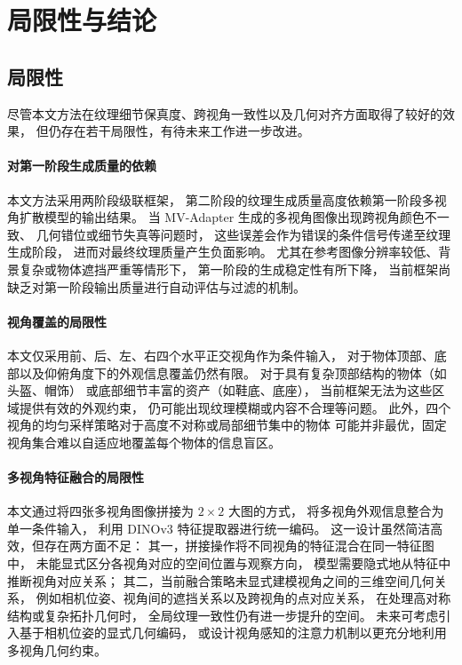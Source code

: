 \cleardoublepage

\section{局限性与结论}

\subsection{局限性}

尽管本文方法在纹理细节保真度、跨视角一致性以及几何对齐方面取得了较好的效果，
但仍存在若干局限性，有待未来工作进一步改进。

\paragraph{对第一阶段生成质量的依赖}

本文方法采用两阶段级联框架，
第二阶段的纹理生成质量高度依赖第一阶段多视角扩散模型的输出结果。
当 MV-Adapter 生成的多视角图像出现跨视角颜色不一致、
几何错位或细节失真等问题时，
这些误差会作为错误的条件信号传递至纹理生成阶段，
进而对最终纹理质量产生负面影响。
尤其在参考图像分辨率较低、背景复杂或物体遮挡严重等情形下，
第一阶段的生成稳定性有所下降，
当前框架尚缺乏对第一阶段输出质量进行自动评估与过滤的机制。

\paragraph{视角覆盖的局限性}

本文仅采用前、后、左、右四个水平正交视角作为条件输入，
对于物体顶部、底部以及仰俯角度下的外观信息覆盖仍然有限。
对于具有复杂顶部结构的物体（如头盔、帽饰）
或底部细节丰富的资产（如鞋底、底座），
当前框架无法为这些区域提供有效的外观约束，
仍可能出现纹理模糊或内容不合理等问题。
此外，四个视角的均匀采样策略对于高度不对称或局部细节集中的物体
可能并非最优，固定视角集合难以自适应地覆盖每个物体的信息盲区。

\paragraph{多视角特征融合的局限性}

本文通过将四张多视角图像拼接为 $2\times2$ 大图的方式，
将多视角外观信息整合为单一条件输入，
利用 DINOv3 特征提取器进行统一编码。
这一设计虽然简洁高效，但存在两方面不足：
其一，拼接操作将不同视角的特征混合在同一特征图中，
未能显式区分各视角对应的空间位置与观察方向，
模型需要隐式地从特征中推断视角对应关系；
其二，当前融合策略未显式建模视角之间的三维空间几何关系，
例如相机位姿、视角间的遮挡关系以及跨视角的点对应关系，
在处理高对称结构或复杂拓扑几何时，
全局纹理一致性仍有进一步提升的空间。
未来可考虑引入基于相机位姿的显式几何编码，
或设计视角感知的注意力机制以更充分地利用多视角几何约束。

